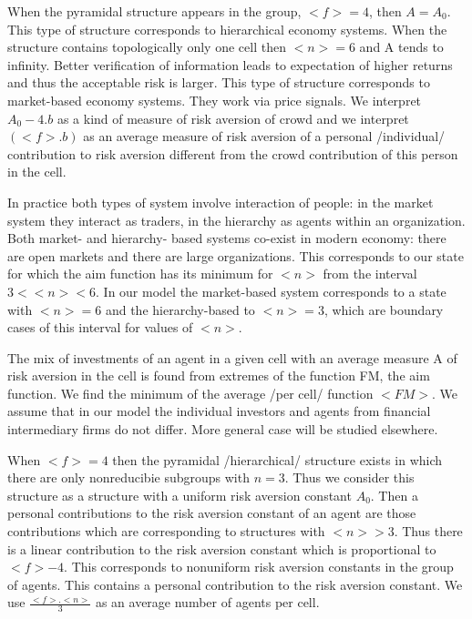 \documentclass[10pt]{article}
\begin{document}
When the pyramidal structure appears in the group, $<f> = 4$, then $A = A_{0} $.
This type of structure  corresponds to hierarchical economy systems. When the structure
contains topologically only one cell then $<n> = 6$ and A tends to infinity. Better verification of information leads to expectation of higher returns and thus the acceptable risk is larger.
This type of structure  corresponds to market-based economy systems. They work via price signals.
We interpret $A_{0}  -  4.b$ as a kind of measure of risk aversion of crowd and we interpret $(<f>.b)$
as an average measure of risk aversion of a personal /individual/ contribution to risk aversion different from the crowd contribution of this person in the cell.

In practice both types of system involve interaction of people: in the market system they interact  as traders, in the hierarchy as agents within an organization. Both market- and hierarchy- based systems co-exist in modern economy: there are open markets and there are  large organizations.
This corresponds to our state for which the aim function has its minimum for $ <n> $ from the interval $ 3 < <n> <6$. In our model the market-based system corresponds to a state with $<n> = 6$ and the hierarchy-based to $<n> = 3$, which are boundary cases of this interval for values of $<n>$.


The mix of investments of an agent in a given cell with an average measure A of risk aversion in the cell is found from
extremes of the function FM, the aim function. We find the minimum of the average  /per cell/ function $<FM>$. We assume that in our model the individual investors and agents from financial intermediary firms do not differ. More general case will be studied elsewhere.

When $<f> = 4$ then the pyramidal /hierarchical/ structure exists in which there are only nonreducibie subgroups with $n = 3$. Thus we consider this structure as a structure with a uniform risk aversion constant $A_{0}$. Then a
personal contributions to the risk aversion constant of an agent are those contributions which are corresponding
to structures with $<n>  > 3$. Thus there is a linear contribution to the risk aversion constant which is proportional to $<f> - 4$. This corresponds to nonuniform risk aversion constants in the group of agents. This contains a personal contribution to
the risk aversion constant.
We use $\frac{<f>.<n>}{3}$ as an average number of agents per cell.
\end{document}
